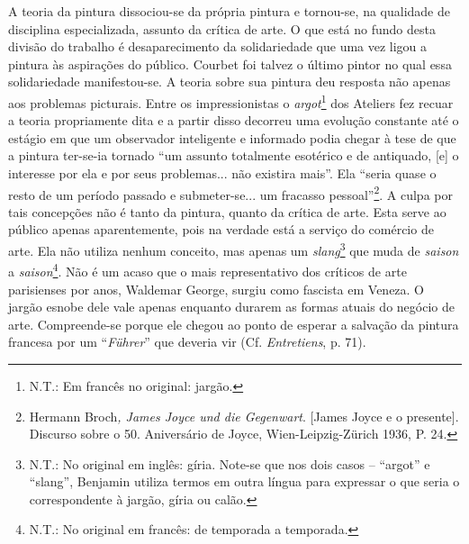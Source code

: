 A teoria da pintura dissociou-se da própria pintura e tornou-se, na
qualidade de disciplina especializada, assunto da crítica de arte. O que
está no fundo desta divisão do trabalho é desaparecimento da
solidariedade que uma vez ligou a pintura às aspirações do público.
Courbet foi talvez o último pintor no qual essa solidariedade
manifestou-se. A teoria sobre sua pintura deu resposta não apenas aos
problemas picturais. Entre os impressionistas o \emph{argot}\footnote{N.T.:
  Em francês no original: jargão.} dos Ateliers fez recuar a teoria
propriamente dita e a partir disso decorreu uma evolução constante até o
estágio em que um observador inteligente e informado podia chegar à tese
de que a pintura ter-se-ia tornado ``um assunto totalmente esotérico e
de antiquado, {[}e{]} o interesse por ela e por seus problemas... não
existira mais''. Ela ``seria quase o resto de um período passado e
submeter-se... um fracasso pessoal''\footnote{Hermann Broch\emph{, James
  Joyce und die Gegenwart}. {[}James Joyce e o presente{]}. Discurso
  sobre o 50. Aniversário de Joyce, Wien-Leipzig-Zürich 1936, P. 24.}. A
culpa por tais concepções não é tanto da pintura, quanto da crítica de
arte. Esta serve ao público apenas aparentemente, pois na verdade está a
serviço do comércio de arte. Ela não utiliza nenhum conceito, mas apenas
um \emph{slang}\footnote{N.T.: No original em inglês: gíria. Note-se que
  nos dois casos -- ``argot'' e ``slang'', Benjamin utiliza termos em
  outra língua para expressar o que seria o correspondente à jargão,
  gíria ou calão.} que muda de \emph{saison} a \emph{saison}\footnote{N.T.:
  No original em francês: de temporada a temporada.}. Não é um acaso que
o mais representativo dos críticos de arte parisienses por anos,
Waldemar George, surgiu como fascista em Veneza. O jargão esnobe dele
vale apenas enquanto durarem as formas atuais do negócio de arte.
Compreende-se porque ele chegou ao ponto de esperar a salvação da
pintura francesa por um ``\emph{Führer}'' que deveria vir (Cf.
\emph{Entretiens}, p. 71).

